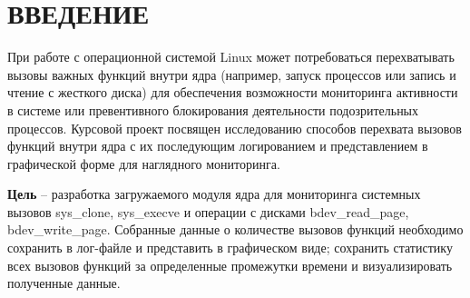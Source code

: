 \chapter*{ВВЕДЕНИЕ}

При работе с операционной системой Linux может потребоваться перехватывать вызовы важных функций внутри ядра (например, запуск процессов или запись и чтение с жесткого диска) для обеспечения возможности мониторинга активности в системе или превентивного блокирования деятельности подозрительных процессов. Курсовой проект посвящен исследованию способов перехвата вызовов функций внутри ядра с их последующим логированием и представлением в графической форме для наглядного мониторинга.

\textbf{Цель} -- разработка загружаемого модуля ядра для мониторинга системных вызовов sys\_clone, sys\_execve и операции с дисками bdev\_read\_page, bdev\_write\_page. Собранные данные о количестве вызовов функций необходимо сохранить в лог-файле и представить в графическом виде; сохранить статистику всех вызовов функций за определенные промежутки времени и визуализировать полученные данные.